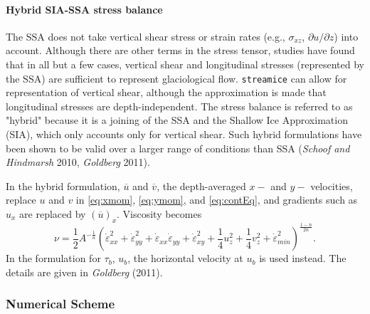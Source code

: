 \paragraph{Hybrid SIA-SSA stress balance}

The SSA does not take vertical shear stress or strain rates (e.g.,
$\sigma_{xz}$, $\partial u/\partial z$) into account. Although there are other
terms in the stress tensor, studies have found that in all but a few cases,
vertical shear and longitudinal stresses (represented by the SSA) are sufficient
to represent glaciological flow. {\tt streamice} can allow for representation of
vertical shear, although the approximation is made that longitudinal stresses
are depth-independent. The stress balance is referred to as "hybrid" because it
is a joining of the SSA and the Shallow Ice Approximation (SIA), which only
accounts only for vertical shear. Such hybrid formulations have been shown to be
valid over a larger range of conditions than SSA (\textit{Schoof and Hindmarsh}
2010, \textit{Goldberg} 2011).

In the hybrid formulation, $\overline{u}$ and $\overline{v}$, the depth-averaged
$x-$ and $y-$ velocities, replace $u$ and $v$ in \eqref{eq:xmom},
\eqref{eq:ymom}, and \eqref{eq:contEq}, and gradients such as $u_x$ are replaced
by $(\overline{u})_x$. Viscosity becomes 
\begin{equation}
 \nu =
\frac{1}{2}A^{-\frac{1}{n}}\left(\dot{\varepsilon}_{xx}^2+\dot{\varepsilon}_{yy}
^2+\dot{\varepsilon}_{xx}\dot{\varepsilon}_{yy}+\dot{\varepsilon}_{xy}^2+\frac{1
}{4}u_z^2+\frac{1}{4}v_z^2+\dot{\varepsilon}_{min}^2\right)^{\frac{1-n}{2n}}.
\end{equation}
In the formulation for $\tau_b$, $u_b$, the horizontal velocity at $u_b$ is used
instead. The details are given in \textit{Goldberg} (2011).

\subsubsection{Numerical Scheme}




